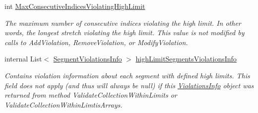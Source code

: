 \begin{DoxyCompactItemize}
int \mbox{\hyperlink{struct_c_s_i_1_1_library_1_1_array_utilities_1_1_array_limit_checks_1_1_violations_info_a4fbecf5adefe2f196a5a157a5636b919}{Max\+Consecutive\+Indices\+Violating\+High\+Limit}}
\begin{DoxyCompactList}\small\item\em The maximum number of consecutive indices violating the high limit. In other words, the longest stretch violating the high limit. This value is not modified by calls to Add\+Violation, Remove\+Violation, or Modify\+Violation. \end{DoxyCompactList}\item 
internal List$<$ \mbox{\hyperlink{class_c_s_i_1_1_library_1_1_array_utilities_1_1_array_limit_checks_1_1_segment_violations_info}{Segment\+Violations\+Info}} $>$ \mbox{\hyperlink{struct_c_s_i_1_1_library_1_1_array_utilities_1_1_array_limit_checks_1_1_violations_info_a4d8eb3881e0de781e5c2e0f283fe38ff}{high\+Limit\+Segments\+Violations\+Info}}
\begin{DoxyCompactList}\small\item\em Contains violation information about each segment with defined high limits. This field does not apply (and thus will always be null) if this \mbox{\hyperlink{struct_c_s_i_1_1_library_1_1_array_utilities_1_1_array_limit_checks_1_1_violations_info}{Violations\+Info}} object was returned from method Validate\+Collection\+Within\+Limits or Validate\+Collection\+Within\+Limtis\+Arrays. \end{DoxyCompactList}\end{DoxyCompactItemize}
